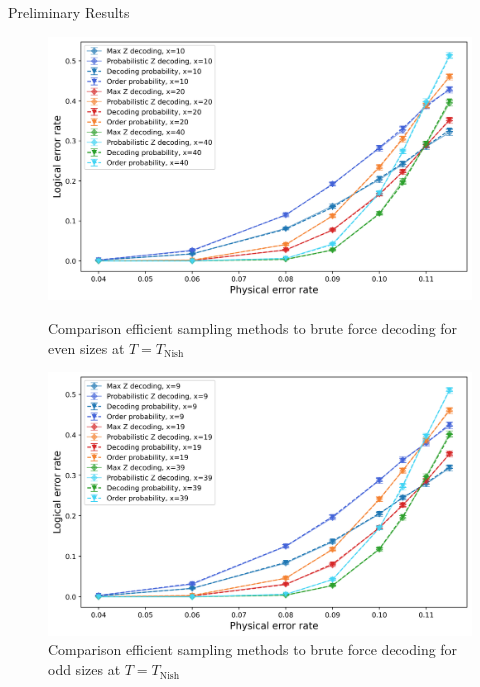 \documentclass{dfki}
\begin{document}
\begin{frame}{Preliminary Results}
	\begin{figure}[h!]
		\centering
		\begin{minipage}{0.45\textwidth}
			\centering
			\includegraphics[width=\textwidth]{fig/MaxZ_ProbabilisticZ_OrderProb_DecodingProb_even_T1.png}
			\caption{Comparison efficient sampling methods to brute force decoding for even sizes at $T=T_{\text{Nish}}$}
		\end{minipage} \hfill
		\begin{minipage}{0.45\textwidth}
			\centering
			\includegraphics[width=\textwidth]{fig/MaxZ_ProbabilisticZ_OrderProb_DecodingProb_odd_T1.png}
			\caption{Comparison efficient sampling methods to brute force decoding for odd sizes at $T=T_{\text{Nish}}$}
		\end{minipage}
	\end{figure}
\end{frame}
\end{document}
